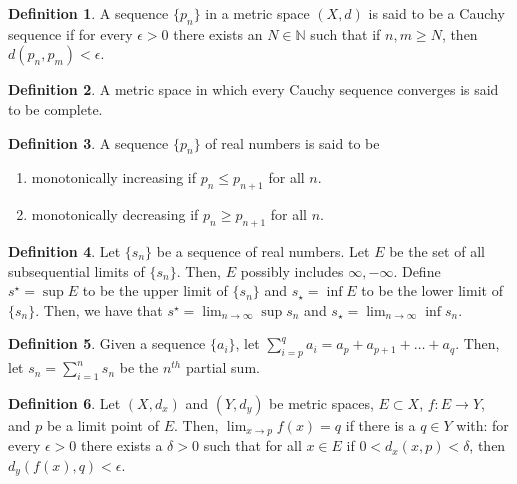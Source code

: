 \documentclass[12pt]{article}
\theoremstyle{definition}
\newtheorem{definition}{Definition}
\theoremstyle{named}
\begin{document}
\renewcommand{\thedefinition}{6.1}
\begin{definition}
    A sequence $\{p_n\}$ in a metric space $(X,d)$ is said to be a Cauchy sequence if for every $\epsilon > 0$ there exists an $N \in \mathbb{N}$ such that if $n,m \geq N$, then $d(p_n,p_m) < \epsilon$. 
\end{definition}

\renewcommand{\thedefinition}{6.1}
\begin{definition}
    A metric space in which every Cauchy sequence converges is said to be complete. 
\end{definition}

\renewcommand{\thedefinition}{6.1}
\begin{definition}
    A sequence $\{p_n\}$ of real numbers is said to be 
    \begin{enumerate}
        \item monotonically increasing if $p_n \leq p_{n+1}$ for all $n$.
        \item monotonically decreasing if $p_n \geq p_{n+1}$ for all $n$. 
    \end{enumerate}
\end{definition}

\renewcommand{\thedefinition}{6.1}
\begin{definition}
    Let $\{s_n\}$ be a sequence of real numbers. Let $E$ be the set of all subsequential limits of $\{s_n\}$. Then, $E$ possibly includes $\infty,-\infty$. Define $s^\star = \sup E$ to be the upper limit of $\{s_n\}$ and $s_\star = \inf E$ to be the lower limit of $\{s_n\}$. Then, we have that $s^\star = \lim_{n \to \infty} \sup s_n$ and $s_\star = \lim_{n \to \infty} \inf s_n$. 
\end{definition}

\renewcommand{\thedefinition}{6.1}
\begin{definition}
    Given a sequence $\{a_i\}$, let $\sum_{i=p}^{q} a_i = a_p + a_{p+1} + \dots + a_q$. Then, let $s_n = \sum_{i=1}^{n} s_n$ be the $n^{th}$ partial sum. 
\end{definition}

\renewcommand{\thedefinition}{6.1}
\begin{definition}
    Let $(X,d_x)$ and $(Y,d_y)$ be metric spaces, $E \subset X$, $f: E \to Y$, and $p$ be a limit point of $E$. Then, $\lim_{x \to p} f(x) = q$ if there is a $q \in Y$ with: for every $\epsilon > 0$ there exists a $\delta > 0$ such that for all $x \in E$ if $0 < d_x(x,p) < \delta$, then $d_y(f(x), q) < \epsilon$. 
\end{definition}
\end{document}
